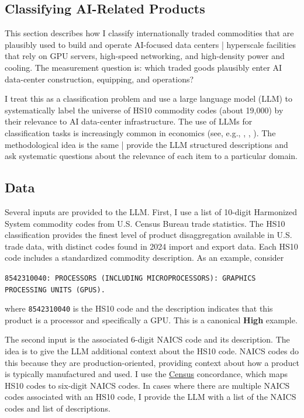 \documentclass[12pt,pdftex]{article}
\newenvironment{prompt}{\par\medskip\noindent}{\par\medskip}
\begin{document}
\begin{onehalfspacing}
\section{Classifying AI-Related Products}\label{sec:measurement}

This section describes how I classify internationally traded commodities that are plausibly used to build and operate AI-focused data centers | hyperscale facilities that rely on GPU servers, high-speed networking, and high-density power and cooling. The measurement question is: which traded goods plausibly enter AI data-center construction, equipping, and operations?

I treat this as a classification problem and use a large language model (LLM) to systematically label the universe of HS10 commodity codes (about 19,000) by their relevance to AI data-center infrastructure. The use of LLMs for classification tasks is increasingly common in economics (see, e.g., \citet{clayton2025geoeconomic}, \citet{lagakos2025american}, \citet{cascaldi2026deregulation}). The methodological idea is the same | provide the LLM structured descriptions and ask systematic questions about the relevance of each item to a particular domain.

\subsection{Data}

Several inputs are provided to the LLM. First, I use a list of 10-digit Harmonized System commodity codes from U.S. Census Bureau trade statistics. The HS10 classification provides the finest level of product disaggregation available in U.S. trade data, with \totalTradeHsCodes{} distinct codes found in 2024 import and export data. Each HS10 code includes a standardized commodity description. As an example, consider
\begin{prompt}
\noindent\texttt{8542310040: PROCESSORS (INCLUDING MICROPROCESSORS): GRAPHICS PROCESSING UNITS (GPUS).}
\end{prompt}
where \texttt{8542310040} is the HS10 code and the description indicates that this product is a processor and specifically a GPU. This is a canonical \textbf{High} example. 

The second input is the associated 6-digit NAICS code and its description. The idea is to give the LLM additional context about the HS10 code. NAICS codes do this because they are production-oriented, providing context about how a product is typically manufactured and used. I use the \href{https://www.census.gov/foreign-trade/schedules/b/2022/imp-code.txt}{Census} concordance, which maps HS10 codes to six-digit NAICS codes. In cases where there are multiple NAICS codes associated with an HS10 code, I provide the LLM with a list of the NAICS codes and list of descriptions. 


\end{onehalfspacing}
\end{document}
